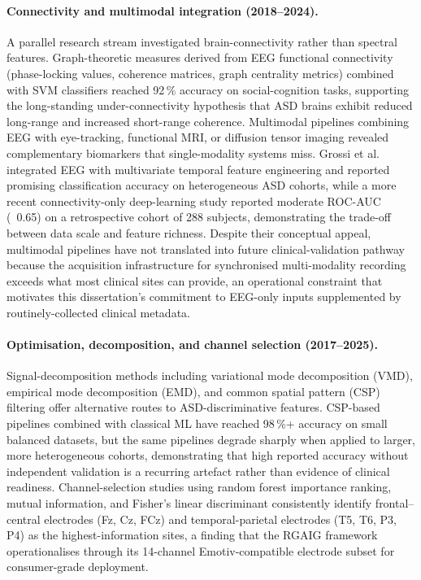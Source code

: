 \paragraph{Connectivity and multimodal integration (2018--2024).}
A parallel research stream investigated brain-connectivity rather than spectral features. Graph-theoretic measures derived from EEG functional connectivity (phase-locking values, coherence matrices, graph centrality metrics) combined with SVM classifiers reached 92\,\% accuracy on social-cognition tasks, supporting the long-standing under-connectivity hypothesis that ASD brains exhibit reduced long-range and increased short-range coherence. Multimodal pipelines combining EEG with eye-tracking, functional MRI, or diffusion tensor imaging revealed complementary biomarkers that single-modality systems miss. Grossi et al.~\cite{grossi2017eeg} integrated EEG with multivariate temporal feature engineering and reported promising classification accuracy on heterogeneous ASD cohorts, while a more recent connectivity-only deep-learning study reported moderate ROC-AUC (~0.65) on a retrospective cohort of 288 subjects, demonstrating the trade-off between data scale and feature richness. Despite their conceptual appeal, multimodal pipelines have not translated into future clinical-validation pathway because the acquisition infrastructure for synchronised multi-modality recording exceeds what most clinical sites can provide, an operational constraint that motivates this dissertation's commitment to EEG-only inputs supplemented by routinely-collected clinical metadata.

\paragraph{Optimisation, decomposition, and channel selection (2017--2025).}
Signal-decomposition methods including variational mode decomposition (VMD), empirical mode decomposition (EMD), and common spatial pattern (CSP) filtering offer alternative routes to ASD-discriminative features. CSP-based pipelines combined with classical ML have reached 98\,\%+ accuracy on small balanced datasets, but the same pipelines degrade sharply when applied to larger, more heterogeneous cohorts, demonstrating that high reported accuracy without independent validation is a recurring artefact rather than evidence of clinical readiness. Channel-selection studies using random forest importance ranking, mutual information, and Fisher's linear discriminant consistently identify frontal--central electrodes (Fz, Cz, FCz) and temporal-parietal electrodes (T5, T6, P3, P4) as the highest-information sites, a finding that the RGAIG framework operationalises through its 14-channel Emotiv-compatible electrode subset for consumer-grade deployment.

